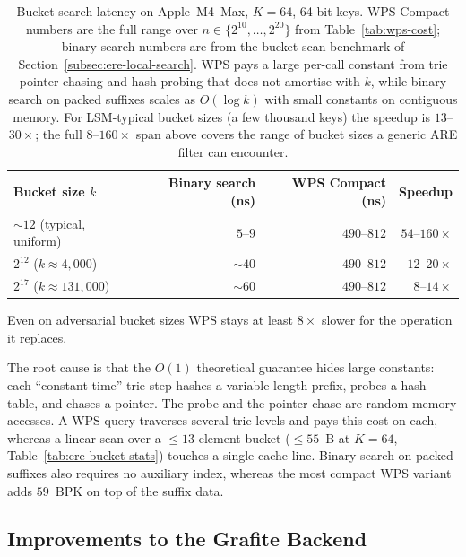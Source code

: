 \begin{table}[H]
    \centering
    \begin{tabular}{@{}lrrr@{}}
        \toprule
        Bucket size $k$                  & Binary search (ns) & WPS Compact (ns) & Speedup            \\
        \midrule
        ${\sim}12$ (typical, uniform)    & $5$--$9$           & $490$--$812$     & $54$--$160\times$  \\
        $2^{12}$ ($k \approx 4{,}000$)   & ${\sim}40$         & $490$--$812$     & $12$--$20\times$   \\
        $2^{17}$ ($k \approx 131{,}000$) & ${\sim}60$         & $490$--$812$     & $8$--$14\times$    \\
        \bottomrule
    \end{tabular}
    \caption{Bucket-search latency on Apple~M4~Max, $K = 64$, 64-bit keys.
    WPS Compact numbers are the full range over $n \in \{2^{10}, \ldots, 2^{20}\}$
    from Table~\ref{tab:wps-cost}; binary search numbers are from the
    bucket-scan benchmark of Section~\ref{subsec:ere-local-search}.
    WPS pays a large per-call constant from trie pointer-chasing and hash
    probing that does not amortise with $k$, while binary search on packed
    suffixes scales as $O(\log k)$ with small constants on contiguous memory.
    For LSM-typical bucket sizes (a few thousand keys) the speedup is
    $13$--$30\times$; the full $8$--$160\times$ span above covers the
    range of bucket sizes a generic ARE filter can encounter.
}
    \label{tab:wps-vs-binsearch}
\end{table}

Even on adversarial bucket sizes WPS stays at least $8\times$ slower for
the operation it replaces.

The root cause is that the $O(1)$ theoretical guarantee hides large constants:
each ``constant-time'' trie step hashes a variable-length prefix, probes a
hash table, and chases a pointer. The probe and the pointer chase are random
memory accesses. A WPS query traverses several trie levels and pays this
cost on each, whereas a linear scan over a ${\leq}13$-element bucket
(${\leq}55$~B at $K = 64$, Table~\ref{tab:ere-bucket-stats}) touches a
single cache line. Binary search on packed suffixes also requires
no auxiliary index, whereas the most compact WPS variant adds $59$~BPK on
top of the suffix data.

\subsection{Improvements to the Grafite Backend}
\label{subsec:grafite-improvements}

